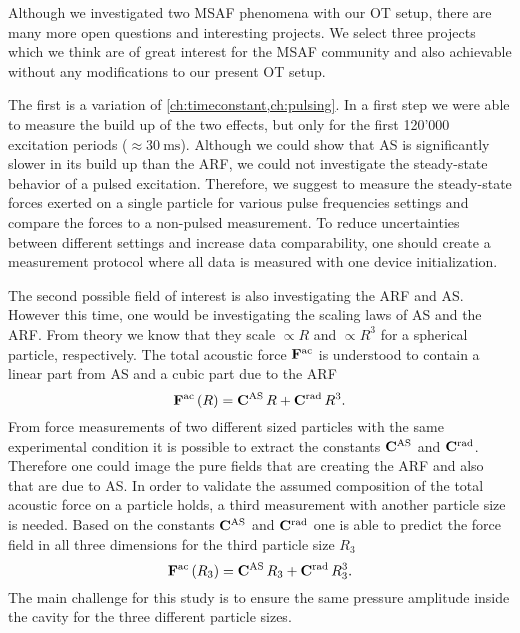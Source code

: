 Although we investigated two MSAF phenomena with our OT setup, there are many 
more open questions and interesting projects. We select three projects which we 
think are of great interest for the MSAF community and also achievable without 
any modifications to our present OT setup.

The first is a variation of \cref{ch:timeconstant,ch:pulsing}. In a first step 
we were able to measure the build up of the two effects, but only for the first 
120'000 excitation periods ($\approx \SI{30}{\ms}$). Although we could show 
that AS is significantly slower in its build up than the ARF, we could not 
investigate the steady-state behavior of a pulsed excitation. Therefore, we 
suggest to measure the steady-state forces exerted on a single particle for 
various pulse frequencies settings and compare the forces to a non-pulsed 
measurement. To reduce uncertainties between different settings and increase 
data comparability, one should create a measurement protocol where all data is 
measured with one device initialization.

The second possible field of interest is also investigating the ARF and AS. 
However this time, one would be investigating the scaling laws of AS and the 
ARF. From theory we know that they scale $\propto R$ and $\propto R^{3}$ for a 
spherical particle, respectively. The total acoustic force 
$\vb{F}^{\mathrm{ac}}$ is understood to contain a linear part from AS and a 
cubic part due to the ARF
\begin{equation}
  \vb{F}^{\mathrm{ac}}\left( R \right) = \vb{C}^{\mathrm{AS}}\,R + 
  \vb{C}^{\mathrm{rad}}\,R^{3}.
\end{equation}
From force measurements of two different sized particles with the same 
experimental condition it is possible to extract the constants 
$\vb{C}^{\mathrm{AS}}$ and $\vb{C}^{\mathrm{rad}}$. Therefore one could image the pure 
fields that are creating the ARF and also that are due to AS. In order to 
validate the assumed composition of the total acoustic force on a particle 
holds, a third measurement with another particle size is needed. Based on the 
constants $\vb{C}^{\mathrm{AS}}$ and $\vb{C}^{\mathrm{rad}}$ one is able to predict the 
force field in all three dimensions for the third particle size $R_{3}$
\begin{equation}
  \vb{F}^{\mathrm{ac}}\left( R_{3} \right) = \vb{C}^{\mathrm{AS}}\,R_{3} + 
  \vb{C}^{\mathrm{rad}}\,R^{3}_{3}.
\end{equation}
The main challenge for this study is to ensure the same pressure amplitude 
inside the cavity for the three different particle sizes.

